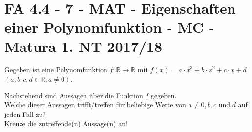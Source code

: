 \section{FA 4.4 - 7 - MAT - Eigenschaften einer Polynomfunktion - MC - Matura 1. NT 2017/18}

\begin{beispiel}[FA 4.4]{1}
Gegeben ist eine Polynomfunktion $f\!:\mathbb{R}\rightarrow\mathbb{R}$ mit $f(x)=a\cdot x^3+b\cdot x^2+c\cdot x+d$ $(a, b, c, d\in\mathbb{R}; a\neq 0)$.

Nachstehend sind Aussagen über die Funktion $f$ gegeben.\\
Welche dieser Aussagen trifft/treffen für beliebige Werte von $a\neq 0, b, c$ und $d$ auf jeden Fall zu?\\
Kreuze die zutreffende(n) Aussage(n) an!

\end{beispiel}